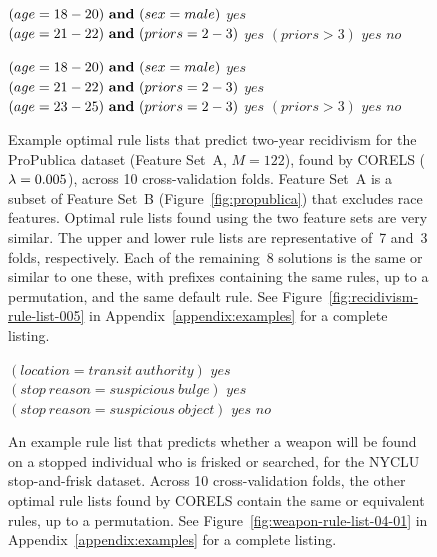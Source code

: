 \begin{figure}[ht!]
\vspace{2mm}
\begin{algorithmic}
\State \bif $(age = 18-20) {\bf ~and~} (sex = male)$ \bthen $yes$
\State \belif $(age = 21-22) {\bf ~and~} (priors = 2-3)$ \bthen $yes$
\State \belif $(priors > 3)$ \bthen $yes$
\State \belse $no$
\end{algorithmic}
\vspace{1mm}
\begin{algorithmic}
\State \bif $(age = 18-20) {\bf ~and~} (sex = male)$ \bthen $yes$
\State \belif $(age = 21-22) {\bf ~and~} (priors = 2-3)$ \bthen $yes$
\State \belif $(age = 23-25) {\bf ~and~} (priors = 2-3)$ \bthen $yes$
\State \belif $(priors > 3)$ \bthen $yes$
\State \belse $no$
\end{algorithmic}
\caption{Example optimal rule lists that predict two-year recidivism for the
ProPublica dataset (Feature Set~A, ${M=122}$), found by CORELS (${{\lambda} = 0.005}$), across 10 cross-validation folds.
%
Feature Set~A is a subset of Feature Set~B (Figure~\ref{fig:propublica}) that excludes race features.
%
Optimal rule lists found using the two feature sets are very similar.
%
The upper and lower rule lists are representative of~7 and~3 folds, respectively.
%
Each of the remaining~8 solutions is the same or similar to one these,
with prefixes containing the same rules, up to a permutation, and the same default rule.
%
See Figure~\ref{fig:recidivism-rule-list-005} in Appendix~\ref{appendix:examples} for a complete listing.
}
\label{fig:recidivism-all-folds}
\end{figure}
%
\begin{figure}[ht!]
\vspace{2mm}
\begin{algorithmic}
\State \bif $(location = transit~authority)$ \bthen $yes$
\State \belif $(stop~reason = suspicious~bulge)$ \bthen $yes$
\State \belif $(stop~reason = suspicious~object)$ \bthen $yes$
\State \belse $no$
\end{algorithmic}
\caption{An example rule list that predicts whether a weapon will be found on a
stopped individual who is frisked or searched, for the NYCLU stop-and-frisk dataset.
%
Across 10 cross-validation folds, the other optimal rule lists found by CORELS
contain the same or equivalent rules, up to a permutation.
%
See Figure~\ref{fig:weapon-rule-list-04-01} in Appendix~\ref{appendix:examples} for a complete listing.
}
\label{fig:weapon-rule-list}
\end{figure}

